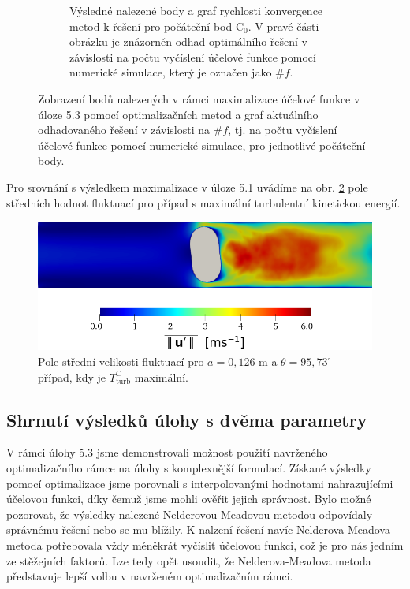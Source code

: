 \begin{figure}[h]
\begin{subfigure}[b]{1.0\textwidth}
\begin{subfigure}[b]{0.38\textwidth}
	\end{subfigure}	
	\caption{Výsledné nalezené body a graf rychlosti konvergence metod k řešení pro počáteční bod C$_0$.  V pravé části obrázku je znázorněn odhad optimálního řešení v závislosti na počtu vyčíslení účelové funkce pomocí numerické simulace, který je označen jako $ \# f $. \vspace{2mm}}
	\end{subfigure}
	\caption{Zobrazení bodů nalezených v rámci maximalizace účelové funkce v úloze 5.3 pomocí optimalizačních metod a graf aktuálního odhadovaného řešení v závislosti na $ \# f $, tj. na počtu vyčíslení účelové funkce pomocí numerické simulace, pro jednotlivé počáteční body.}
	\label{fig:vysledky cassini}
\end{figure}

\newpage

Pro srovnání s výsledkem maximalizace v úloze 5.1 uvádíme na obr. \ref{fig:paraview cassini} pole středních hodnot fluktuací pro případ s maximální turbulentní kinetickou energií.

\begin{figure}[H]
	\vspace{3mm}
	\centering
	\includegraphics[width=0.71	\textwidth]{Images/cassini_max.png}

	\caption{Pole střední velikosti fluktuací pro $a = 0{,}126$ m a $ \theta = 95{,}73^{\circ}$ - případ, kdy je $ T^{\text{C}}_{ \text{turb}} $ maximální.}
	\label{fig:paraview cassini}
\end{figure}

\subsection{Shrnutí výsledků úlohy s dvěma parametry}
V rámci úlohy 5.3 jsme demonstrovali možnost použití navrženého optimalizačního rámce na úlohy s komplexnější formulací. Získané výsledky pomocí optimalizace jsme porovnali s interpolovanými hodnotami nahrazujícími účelovou funkci, díky čemuž jsme mohli ověřit jejich správnost. Bylo možné pozorovat, že výsledky nalezené Nelderovou-Meadovou metodou odpovídaly správnému řešení nebo se mu blížily. K nalzení řešení navíc Nelderova-Meadova metoda potřebovala vždy méněkrát vyčíslit účelovou funkci, což je pro nás jedním ze stěžejních faktorů. Lze tedy opět usoudit, že Nelderova-Meadova metoda představuje lepší volbu v navrženém optimalizačním rámci.
\newpage
